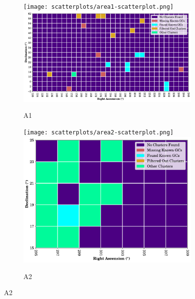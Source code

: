 \begin{figure}[H]
    \centering

    \begin{subfigure}[b]{0.49\textwidth}
        \texttt{[image: scatterplots/area1-scatterplot.png]}
        \includegraphics[height=0.6\textwidth]{./figures/rasters/grids/grid-combined-a1.pdf}
        \caption{A1}
        \label{fig:a1-cluster-overview}
    \end{subfigure}
    \begin{subfigure}[b]{0.49\textwidth}
        \texttt{[image: scatterplots/area2-scatterplot.png]}
        \includegraphics[height=0.6\textwidth]{./figures/rasters/grids/grid-combined-a2.pdf}
        \caption{A2}
        \label{fig:a2-cluster-overview}
    \end{subfigure}


\end{figure}
